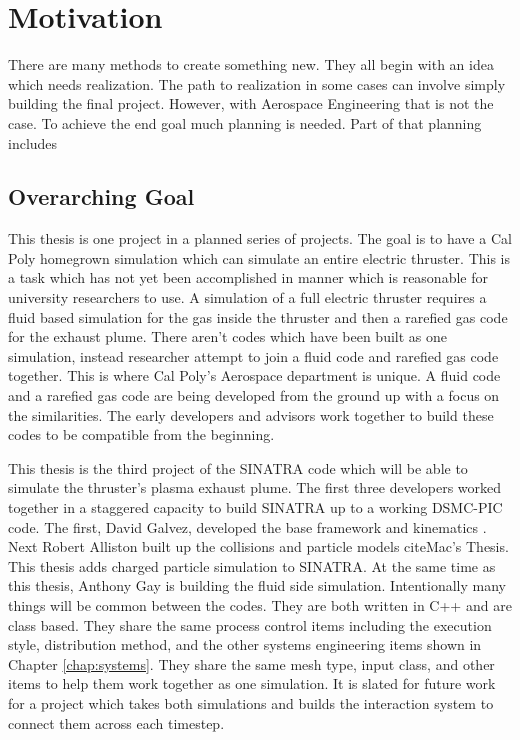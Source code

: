 \section{Motivation}
There are many methods to create something new. They all begin with an idea which needs realization. The path to realization in some cases can involve simply building the final project. However, with Aerospace Engineering that is not the case. To achieve the end goal much planning is needed. Part of that planning includes 

\subsection{Overarching Goal}
This thesis is one project in a planned series of projects. The goal is to have a Cal Poly homegrown simulation which can simulate an entire electric thruster. This is a task which has not yet been accomplished in manner which is reasonable for university researchers to use. A simulation of a full electric thruster requires a fluid based simulation for the gas inside the thruster and then a rarefied gas code for the exhaust plume. There aren't codes which have been built as one simulation, instead researcher attempt to join a fluid code and rarefied gas code together. This is where Cal Poly's Aerospace department is unique. A fluid code and a rarefied gas code are being developed from the ground up with a focus on the similarities. The early developers and advisors work together to build these codes to be compatible from the beginning. \par

\indent This thesis is the third project of the SINATRA code which will be able to simulate the thruster's plasma exhaust plume. The first three developers worked together in a staggered capacity to build SINATRA up to a working DSMC-PIC code. The first, David Galvez, developed the base framework and kinematics \cite{Galvez2018a}. Next Robert Alliston built up the collisions and particle models cite{Mac's Thesis}. This thesis adds charged particle simulation to SINATRA. At the same time as this thesis, Anthony Gay is building the fluid side simulation. Intentionally many things will be common between the codes. They are both written in C++ and are class based. They share the same process control items including the execution style, distribution method, and the other systems engineering items shown in Chapter \ref{chap:systems}. They share the same mesh type, input class, and other items to help them work together as one simulation. It is slated for future work for a project which takes both simulations and builds the interaction system to connect them across each timestep. 




